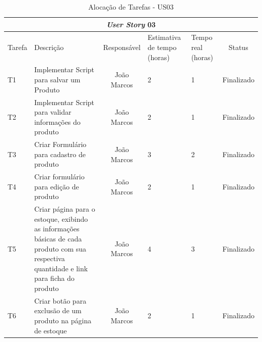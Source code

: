 \documentclass[a4paper,12pt]{monografia}
\begin{document}
\newpage

\begin{longtable}{|p{1.5cm}|p{3.5cm}|c|p{2cm}|p{2cm}|c|}
\caption{Alocação de Tarefas - US03}
\label{quadro:tati-us03}
\hline
\multicolumn{6}{|c|}{\textbf{\textit{User Story} 03}}\\
\hline		
\rowcolor{ballblue}
Tarefa & Descrição & Responsável & Estimativa de tempo (horas) & Tempo real (horas) & Status\\
\hline
T1 & Implementar Script para salvar um Produto & João Marcos & 2 & 1 & Finalizado\\
\hline
T2 & Implementar Script para validar informações do produto & João Marcos & 2 & 1 & Finalizado\\
\hline
T3 & Criar Formulário para cadastro de produto & João Marcos & 3 & 2 & Finalizado\\
\hline
T4 & Criar formulário para edição de produto & João Marcos & 2 & 1 & Finalizado\\
\hline
T5 & Criar página para o estoque, exibindo as informações básicas de cada produto com sua respectiva quantidade e link para ficha do produto & João Marcos & 4 & 3 & Finalizado\\
\hline
T6 & Criar botão para exclusão de um produto na página de estoque & João Marcos & 2 & 1 & Finalizado\\
\hline
\end{longtable}
\end{document}
